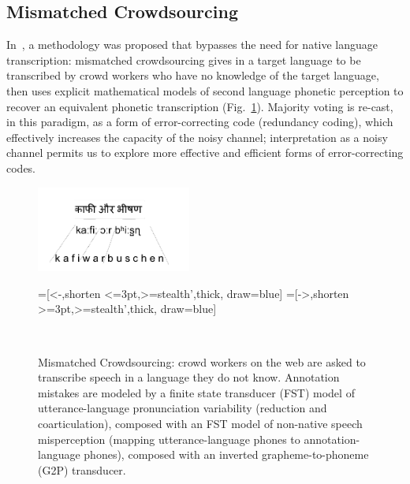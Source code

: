 \subsection{Mismatched Crowdsourcing}

In~\cite{JHJ15a}, a methodology was proposed that bypasses the need
for native language transcription: mismatched crowdsourcing gives in a
target language to be transcribed by crowd workers who have no
knowledge of the target language, then uses explicit mathematical
models of second language phonetic perception to recover an equivalent
phonetic transcription (Fig.~\ref{fig:h2e_eg2}).  Majority voting is
re-cast, in this paradigm, as a form of error-correcting code
(redundancy coding), which effectively increases the capacity of the
noisy channel; interpretation as a noisy channel permits us to explore
more effective and efficient forms of error-correcting codes.

\begin{figure}[b!]\setlength{\textfloatsep}{3mm}
\centerline{\includegraphics[width=2in]{../figs/h2e_eg1.png}}
\begin{center}
  =[<-,shorten <=3pt,>=stealth',thick, draw=blue]
  =[->,shorten >=3pt,>=stealth',thick, draw=blue]
  \\
\end{center}
\setlength{\abovecaptionskip}{0pt}
\caption{Mismatched Crowdsourcing: crowd workers on the web are asked
  to transcribe speech in a language they do not know.  Annotation
  mistakes are modeled by a finite state transducer (FST) model of
  utterance-language pronunciation variability (reduction and
  coarticulation), composed with an FST model of non-native speech
  misperception (mapping utterance-language phones to
  annotation-language phones), composed with an inverted
  grapheme-to-phoneme (G2P) transducer.}
\label{fig:h2e_eg2}
\end{figure}

